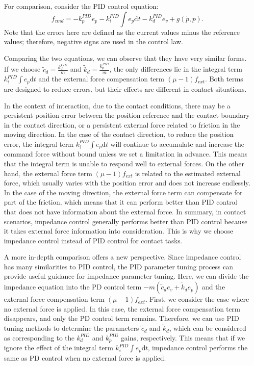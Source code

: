 For comparison, consider the PID control equation:
\begin{equation}
\label{eq:PID cmd}
{{f}_{cmd}}=-k_p^{PID}e_p-k_i^{PID}\int e_p\mathrm{d}t-k_d^{PID}e_v+g(\dot{p}, p).
\end{equation}
Note that the errors here are defined as the current values minus the reference values; therefore, negative signs are used in the control law.

Comparing the two equations, we can observe that they have very similar forms. If we choose $\tilde{c}_d=\frac{k_d^{PID}}{m}$ and $\tilde{k}_d=\frac{k_p^{PID}}{m}$, the only differences lie in the integral term $k_i^{PID}\int e_p\mathrm{d}t$ and the external force compensation term $(\mu-1){{f}_{ext}}$. Both terms are designed to reduce errors, but their effects are different in contact situations.


In the context of interaction, due to the contact conditions, there may be a persistent position error between the position reference and the contact boundary in the contact direction, or a persistent external force related to friction in the moving direction. In the case of the contact direction, to reduce the position error, the integral term $k_i^{PID}\int e_p\mathrm{d}t$ will continue to accumulate and increase the command force without bound unless we set a limitation in advance. This means that the integral term is unable to respond well to external forces. On the other hand, the external force term $(\mu-1){{f}_{ext}}$ is related to the estimated external force, which usually varies with the position error and does not increase endlessly. In the case of the moving direction, the external force term can compensate for part of the friction, which means that it can perform better than PID control that does not have information about the external force. In summary, in contact scenarios, impedance control generally performs better than PID control because it takes external force information into consideration. This is why we choose impedance control instead of PID control for contact tasks.


A more in-depth comparison offers a new perspective. Since impedance control has many similarities to PID control, the PID parameter tuning process can provide useful guidance for impedance parameter tuning. Here, we can divide the impedance equation into the PD control term $-m({\tilde{c}_de_v+\tilde{k}_de_p})$ and the external force compensation term $(\mu-1){{f}_{ext}}$. First, we consider the case where no external force is applied. In this case, the external force compensation term disappears, and only the PD control term remains. Therefore, we can use PID tuning methods to determine the parameters $\tilde{c}_d$ and $\tilde{k}_d$, which can be considered as corresponding to the $k_d^{PID}$ and $k_p^{PID}$ gains, respectively. This means that if we ignore the effect of the integral term $k_i^{PID}\int e_p\mathrm{d}t$, impedance control performs the same as PD control when no external force is applied.


